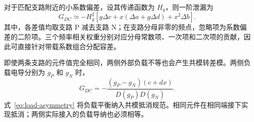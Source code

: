 对于匹配支路附近的小系数偏差，设其传递函数为 $H_g$，则一阶泄漏为
\begin{equation}\label{eq:sensitivity}
G_{DC}\simeq-H_g^2\left[g\Delta c+x(\Delta a+g\Delta d)+x^2\Delta b\right].
\end{equation}
其中，各差值均取支路 P 减去支路 N；在支路分母非零的频点，忽略项为系数偏差的二阶项。三个频率相关权重分别对应分母常数项、一次项和二次项的贡献，因此可直接针对带载系数组合分配容差。

即使两条支路的元件值完全相同，两侧外部负载不等也会产生共模转差模。两侧负载电导分别为 $g_P$ 和 $g_N$ 时，
\begin{equation}\label{eq:load-asymmetry}
G_{DC}=-\frac{(g_P-g_N)(c+dx)}{D(g_P)D(g_N)}.
\end{equation}
式~\eqref{eq:load-asymmetry} 将负载平衡纳入共模抵消规范。相同元件在相同端接下实现抵消；两侧实际接入的负载导纳也必须相等。

\FloatBarrier
